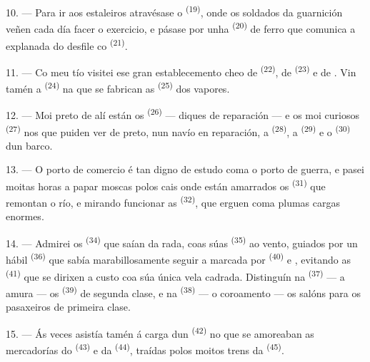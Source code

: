 10. --- Para ir aos estaleiros atravésase o 
\textsuperscript{(19)}, onde os soldados da guarnición veñen cada día facer o
exercicio, e pásase por unha  \textsuperscript{(20)} de ferro que
comunica a explanada do desfile co  \textsuperscript{(21)}.

\VUsaut{3.0mm}
\VUsaut{3.0mm}

11. --- Co meu tío visitei ese gran establecemento cheo de 
\textsuperscript{(22)}, de  \textsuperscript{(23)} e de .
Vin tamén a  \textsuperscript{(24)} na que se fabrican as
 \textsuperscript{(25)} dos vapores.

12. --- Moi preto de alí están os  \textsuperscript{(26)} --- diques de
reparación --- e os moi curiosos  \textsuperscript{(27)} nos
que puiden ver de preto, nun navío en reparación, a 
\textsuperscript{(28)}, a  \textsuperscript{(29)} e o 
\textsuperscript{(30)} dun barco.

13. --- O porto de comercio é tan digno de estudo coma o porto de guerra, e pasei
moitas horas a papar moscas polos cais onde están amarrados os  \textsuperscript{(31)} que remontan o río, e mirando funcionar as  \textsuperscript{(32)}, que erguen coma plumas cargas enormes.

\VUsaut{3.0mm}
\VUsaut{3.0mm}

14. --- Admirei os  \textsuperscript{(34)} que saían da rada,
coas súas  \textsuperscript{(35)} ao vento, guiados por un hábil
 \textsuperscript{(36)} que sabía marabillosamente seguir a
 marcada por  \textsuperscript{(40)} e ,
evitando as  \textsuperscript{(41)} que se dirixen a custo coa súa
única vela cadrada. Distinguín na  \textsuperscript{(37)} --- a
amura --- os  \textsuperscript{(39)} de segunda clase, e na
 \textsuperscript{(38)} --- o coroamento --- os salóns para os
pasaxeiros de primeira clase.

15. --- Ás veces asistía tamén á carga dun  \textsuperscript{(42)}
no que se amoreaban as mercadorías do  \textsuperscript{(43)} e da
 \textsuperscript{(44)}, traídas polos moitos trens da
 \textsuperscript{(45)}.

